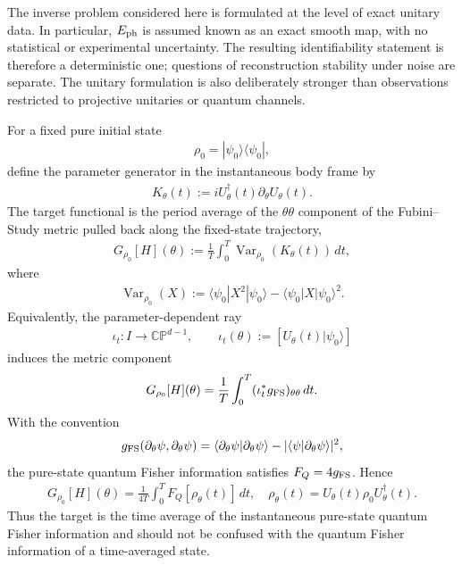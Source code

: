 \documentclass[twocolumn,prl,aps,floatfix]{revtex4-2}
\begin{document}
The inverse problem considered here is formulated at the level of exact unitary data. In particular, $E_{\rm ph}$ is assumed known as an exact smooth map, with no statistical or experimental uncertainty. The resulting identifiability statement is therefore a deterministic one; questions of reconstruction stability under noise are separate. The unitary formulation is also deliberately stronger than observations restricted to projective unitaries or quantum channels.

For a fixed pure initial state
\begin{align}
\rho_0=|\psi_0\rangle\langle\psi_0|,
\end{align}
define the parameter generator in the instantaneous body frame by
\begin{align}
K_\theta(t)
:=
iU_\theta^\dagger(t)\partial_\theta U_\theta(t).
\label{eq:K}
\end{align}
The target functional is the period average of the $\theta\theta$ component of the Fubini--Study metric pulled back along the fixed-state trajectory,
\begin{align}
G_{\rho_0}[H](\theta)
:=
\frac{1}{T}
\int_0^T
\operatorname{Var}_{\rho_0}
\!\left(K_\theta(t)\right)\,dt ,
\label{eq:G}
\end{align}
where
\begin{align}
\operatorname{Var}_{\rho_0}(X)
:=
\langle\psi_0|X^2|\psi_0\rangle
-
\langle\psi_0|X|\psi_0\rangle^2 .
\end{align}
Equivalently, the parameter-dependent ray
\begin{align}
\iota_t:I\longrightarrow\mathbb{CP}^{d-1},
\qquad
\iota_t(\theta)
:=[U_\theta(t)|\psi_0\rangle]
\end{align}
induces the metric component
\begin{align}
G_{\rho_0}[H](\theta)
=
\frac{1}{T}
\int_0^T
(\iota_t^*g_{\rm FS})_{\theta\theta}\,dt .
\label{eq:G_FS}
\end{align}
With the convention
\begin{align}
g_{\rm FS}
(\partial_\theta\psi,\partial_\theta\psi)
=
\langle\partial_\theta\psi|\partial_\theta\psi\rangle
-
|\langle\psi|\partial_\theta\psi\rangle|^2 ,
\end{align}
the pure-state quantum Fisher information satisfies $F_Q=4g_{\rm FS}$. Hence
\begin{align}
G_{\rho_0}[H](\theta)
=
\frac{1}{4T}
\int_0^T
F_Q[\rho_\theta(t)]\,dt ,
\quad
\rho_\theta(t)
=
U_\theta(t)\rho_0U_\theta^\dagger(t).
\label{eq:QFI}
\end{align}
Thus the target is the time average of the instantaneous pure-state quantum Fisher information and should not be confused with the quantum Fisher information of a time-averaged state.
\end{document}
